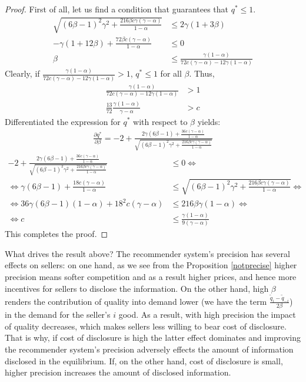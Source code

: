 \documentclass[a4paper]{article}
\begin{document}
\begin{proof}
	First of all, let us find a condition that guarantees that $q^* \le 1$. 
	\begin{align*}
	\sqrt{(6 \beta - 1)^2 \gamma^2 + \frac{216 \beta c \gamma (\gamma - \alpha)}{1-\alpha}} &\le 2\gamma (1+3 \beta)\\
	-\gamma(1+12 \beta) + \frac{72 \beta c (\gamma - \alpha)}{1 - \alpha} &\le 0\\
	\beta &\le \frac{\gamma(1-\alpha)}{72c (\gamma - \alpha) - 12 \gamma (1-\alpha)}
	\end{align*}
	Clearly, if $\frac{\gamma(1-\alpha)}{72c (\gamma - \alpha) - 12 \gamma (1-\alpha)} > 1$, $q^* \le 1$ for all $\beta$. Thus, 
	\begin{align*}
	\frac{\gamma(1-\alpha)}{72c (\gamma - \alpha) - 12 \gamma (1-\alpha)} &> 1\\
	\frac{13}{72} \frac{\gamma(1-\alpha)}{\gamma - \alpha} &> c
	\end{align*}
	Differentiated the expression for $q^*$ with respect to $\beta$ yields:
	\begin{align*}
	\frac{\partial q^*}{\partial \beta} = -2 + \frac{2 \gamma (6 \beta - 1) + \frac{36 c (\gamma - \alpha)}{1-\alpha}}{ \sqrt{(6 \beta - 1)^2\gamma^2 + \frac{216 \beta c \gamma (\gamma - \alpha)}{1-\alpha}}}
	\end{align*} 
	\begin{align*}
	-2 + \frac{2 \gamma (6 \beta - 1) + \frac{36 c (\gamma - \alpha)}{1-\alpha}}{ \sqrt{(6 \beta - 1)^2\gamma^2 + \frac{216 \beta c \gamma (\gamma - \alpha)}{1-\alpha}}} &\le 0 \iff\\
	\iff \gamma(6 \beta - 1) + \frac{18c(\gamma - \alpha)}{1- \alpha} &\le \sqrt{(6 \beta - 1)^2\gamma^2 + \frac{216 \beta c \gamma (\gamma - \alpha)}{1-\alpha}} \iff\\
	\iff 36 \gamma (6 \beta - 1)(1-\alpha) + 18^2 c(\gamma - \alpha) &\le 216 \beta \gamma (1-\alpha) \iff\\
	\iff c &\le \frac{\gamma(1 - \alpha)}{9(\gamma - \alpha)}  
	\end{align*} 
	This completes the proof.
\end{proof}


What drives the result above? The recommender system's precision has several effects on sellers: on one hand, as we see from the Proposition \ref{notprecise} higher precision means softer competition and as a result higher prices, and hence more incentives for sellers to disclose the information. On the other hand, high $\beta$ renders the contribution of quality into demand lower (we have the term $\frac{\tilde{q}_i - \tilde{q}_{-i}}{2 \beta}$) in the demand for the seller's $i$ good. As a result, with high precision the impact of quality decreases, which makes sellers less willing to bear cost of disclosure. That is why, if cost of disclosure is high the latter effect dominates and improving the recommender system's precision adversely effects the amount of information disclosed in the equilibrium. If, on the other hand, cost of disclosure is small, higher precision increases the amount of disclosed information. 
\end{document}
